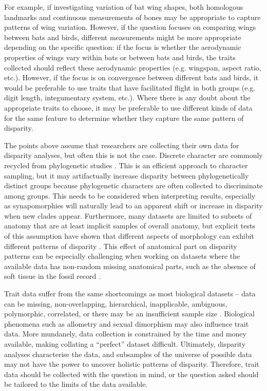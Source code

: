 \documentclass[12pt,letterpaper]{article}
\begin{document}
For example, if investigating variation of bat wing shapes, both homologous landmarks and continuous measurements of bones may be appropriate to capture patterns of wing variation.
However, if the question focuses on comparing wings between bats and birds, different measurements might be more appropriate depending on the specific question: if the focus is whether the aerodynamic properties of wings vary within bats or between bats and birds, the traits collected should reflect these aerodynamic properties (e.g. wingspan, aspect ratio, etc.).
However, if the focus is on convergence between different bats and birds, it would be preferable to use traits that have facilitated flight in both groups (e.g. digit length, integumentary system, etc.).
Where there is any doubt about the appropriate traits to choose, it may be preferable to use different kinds of data for the same feature to determine whether they capture the same pattern of disparity.

The points above assume that researchers are collecting their own data for disparity analyses, but often this is not the case.
Discrete character are commonly recycled from phylogenetic studies \citep[e.g.][]{Brusatte2008-fx,Close2015-qi,Wright2017-jo}.
This is an efficient approach to character sampling, but it may artifactually increase disparity between phylogenetically distinct groups because phylogenetic characters are often collected to discriminate among groups.
This needs to be considered when interpreting results, especially as synapomorphies will naturally lead to an apparent shift or increase in disparity when new clades appear.
Furthermore, many datasets are limited to subsets of anatomy that are at least implicit samples of overall anatomy, but explicit tests of this assumption have shown that different aspects of morphology can exhibit different patterns of disparity \citep{Hopkins2017-cf}.
This effect of anatomical part on disparity patterns can be especially challenging when working on datasets where the available data has non-random missing anatomical parts, such as the absence of soft tissue in the fossil record \citep{Deline2018-le}.

Trait data suffer from the same shortcomings as most biological datasets -- data can be missing, non-overlapping, hierarchical, inapplicable, ambiguous, polymorphic, correlated, or there may be an insufficient sample size \citep{Brazeau2017-kg, Palci2018-ni}.
Biological phenomena such as allometry and sexual dimorphism may also influence trait data.
More mundanely, data collection is constrained by the time and money available, making collating a ``perfect'' dataset difficult.
Ultimately, disparity analyses characterise the data, and subsamples of the universe of possible data may not have the power to uncover holistic patterns of disparity.
Therefore, trait data should be collected with the question in mind, or the question asked should be tailored to the limits of the data available.
\end{document}
